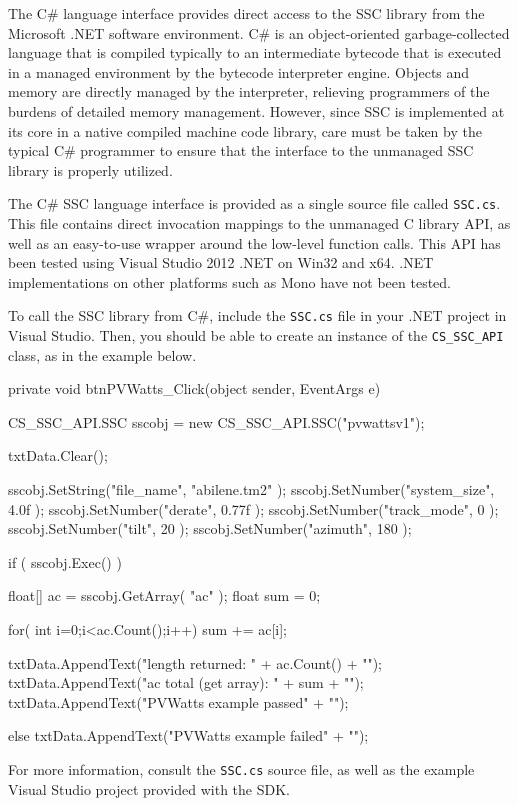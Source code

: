\documentclass{article}
\begin{document}
The C\# language interface provides direct access to the SSC library from the Microsoft .NET software environment.  C\# is an object-oriented garbage-collected language that is compiled typically to an intermediate bytecode that is executed in a managed environment by the bytecode interpreter engine.  Objects and memory are directly managed by the interpreter, relieving programmers of the burdens of detailed memory management.  However, since SSC is implemented at its core in a native compiled machine code library, care must be taken by the typical C\# programmer to ensure that the interface to the unmanaged SSC library is properly utilized.

The C\# SSC language interface is provided as a single source file called \texttt{SSC.cs}.  This file contains direct invocation mappings to the unmanaged C library API, as well as an easy-to-use wrapper around the low-level function calls.  This API has been tested using Visual Studio 2012 .NET on Win32 and x64.  .NET implementations on other platforms such as Mono have not been tested.

To call the SSC library from C\#, include the \texttt{SSC.cs} file in your .NET project in Visual Studio.  Then, you should be able to create an instance of the \texttt{CS\_SSC\_API} class, as in the example below.

\begin{verbatimtab}[4]
private void btnPVWatts_Click(object sender, EventArgs e)
{
	CS_SSC_API.SSC sscobj = new CS_SSC_API.SSC("pvwattsv1");

	txtData.Clear();

	sscobj.SetString("file_name", "abilene.tm2" );
	sscobj.SetNumber("system_size", 4.0f );
	sscobj.SetNumber("derate", 0.77f );
	sscobj.SetNumber("track_mode", 0 );
	sscobj.SetNumber("tilt", 20 );
	sscobj.SetNumber("azimuth", 180 );

	if ( sscobj.Exec() )
	{
		float[] ac = sscobj.GetArray( "ac" );
		float sum = 0;
	
		for( int i=0;i<ac.Count();i++)
		{
			sum += ac[i];
		}

		txtData.AppendText("length returned: " + ac.Count() + "\n");
		txtData.AppendText("ac total (get array): " + sum + "\n");
		txtData.AppendText("PVWatts example passed" + "\n");
	}
	else
	{
		txtData.AppendText("PVWatts example failed" + "\n");
	}
}

\end{verbatimtab}

For more information, consult the \texttt{SSC.cs} source file, as well as the example Visual Studio project provided with the SDK.
\end{document}
